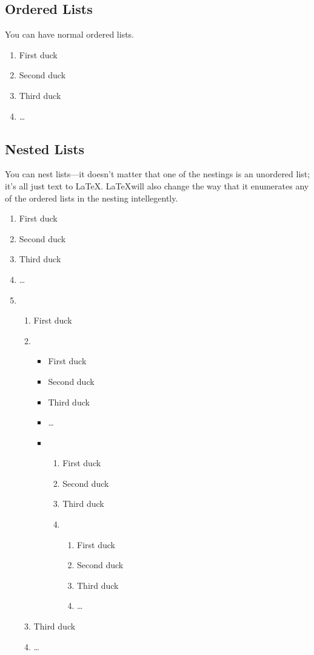 \documentclass{article}
\begin{document}
\subsection{Ordered Lists}
You can have normal ordered lists.
\begin{enumerate}
  \item First duck
  \item Second duck
  \item Third duck
  \item \ldots
\end{enumerate}

\subsection{Nested Lists}
You can nest lists---it doesn't matter that one of the nestings is an
unordered list; it's all just text to \LaTeX. \LaTeX will also change the way
that it enumerates any of the ordered lists in the nesting intellegently.
\begin{enumerate}
  \item First duck
  \item Second duck
  \item Third duck
  \item \ldots
  \item
    \begin{enumerate}
    \item First duck
    \item
      \begin{itemize}
      \item First duck
      \item Second duck
      \item Third duck
      \item \ldots
      \item
        \begin{enumerate}
        \item First duck
        \item Second duck
        \item Third duck
        \item
          \begin{enumerate}
          \item First duck
          \item Second duck
          \item Third duck
          \item \ldots
          \end{enumerate}
        \end{enumerate}
      \end{itemize}
    \item Third duck
    \item \ldots
    \end{enumerate}
\end{enumerate}
\end{document}
